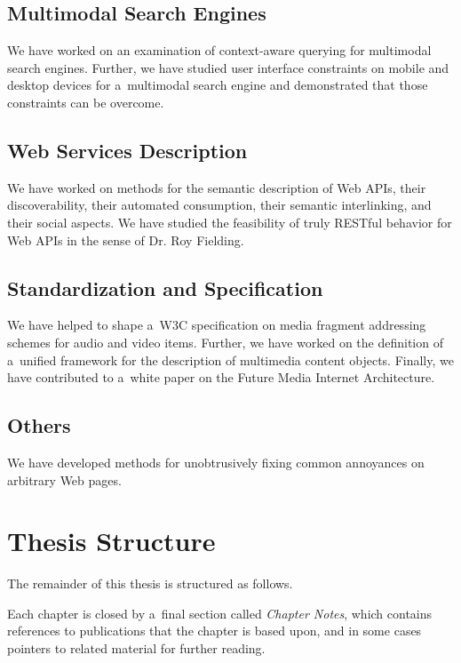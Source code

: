 \subsection{Multimodal Search Engines}

We have worked on an examination of context-aware querying
for multimodal search engines.
Further, we have studied user interface constraints on
mobile and desktop devices for a~multimodal search engine
and demonstrated that those constraints can be overcome.

\subsection{Web Services Description}

We have worked on methods for the semantic description of Web APIs,
their discoverability, their automated consumption,
their semantic interlinking, and their social aspects.
We have studied the feasibility of truly RESTful behavior
for Web APIs in the sense of Dr. Roy Fielding.
        
\subsection{Standardization and Specification}        
We have helped to shape a~W3C specification on media
fragment addressing schemes for audio and video items.
Further, we have worked on the definition of a~unified framework
for the description of multimedia content objects.
Finally, we have contributed to a~white paper on the
Future Media Internet Architecture.

\subsection{Others}

We have developed methods for unobtrusively fixing
common annoyances on arbitrary Web pages.

\section{Thesis Structure}

The remainder of this thesis is structured as follows. 

Each chapter is closed by a~final section called
\emph{Chapter Notes}, which contains references to publications
that the chapter is based upon,
and in some cases pointers to related material for further reading.



